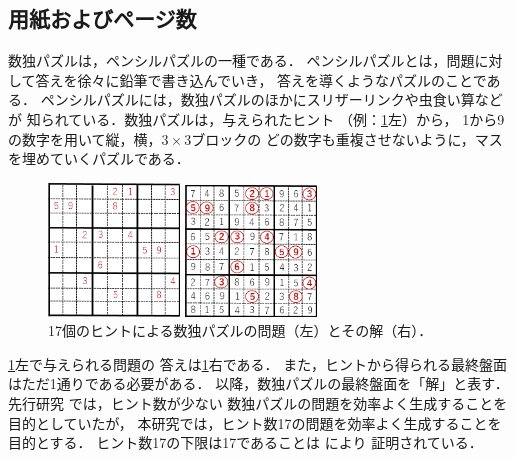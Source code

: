 \documentclass[a4paper, 9pt]{jarticle}
\begin{document}
\small

\twocolumn[\vspace*{29mm}] %
\begin{論文概要}           %

\section{用紙およびページ数}
数独パズルは，ペンシルパズルの一種である．
ペンシルパズルとは，問題に対して答えを徐々に鉛筆で書き込んでいき，
答えを導くようなパズルのことである．
ペンシルパズルには，数独パズルのほかにスリザーリンクや虫食い算などが
知られている．数独パズルは，与えられたヒント
（例：\figurename{\ref{fig:problem_and_answer}}左）から，
1から9の数字を用いて縦，横，$3 \times 3$ブロックの
どの数字も重複させないように，マスを埋めていくパズルである．
\begin{figure}[b]
  \begin{minipage}[b]{0.49\linewidth}
    \centering
    \includegraphics[width=3.5cm]{問題.png}
  \end{minipage}
  \begin{minipage}[b]{0.49\linewidth}
    \centering
    \includegraphics[width=3.5cm]{回答.png}
  \end{minipage}
  \caption{17個のヒントによる数独パズルの問題（左）とその解（右）．}
  \label{fig:problem_and_answer}
\end{figure}
\figurename{\ref{fig:problem_and_answer}}左で与えられる問題の
答えは\figurename{\ref{fig:problem_and_answer}}右である．
また，ヒントから得られる最終盤面はただ1通りである必要がある．
以降，数独パズルの最終盤面を「解」と表す．
先行研究 \cite{previous_research}では，ヒント数が少ない
数独パズルの問題を効率よく生成することを目的としていたが，
本研究では，ヒント数17の問題を効率よく生成することを目的とする．
ヒント数17の下限は17であることは \cite{seventeen_hints} により
証明されている．


\end{論文概要}
\end{document}

